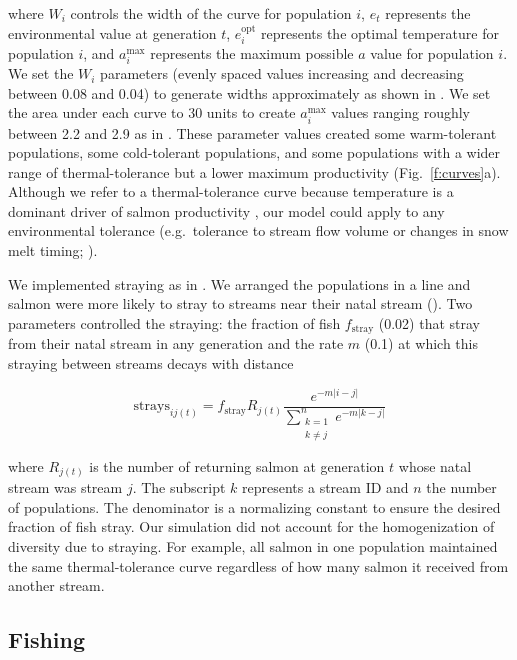 \noindent
where $W_i$ controls the width of the curve for population $i$, $e_t$ represents the environmental value at generation $t$, $e_i^{\mathrm{opt}}$ represents the optimal temperature for population $i$, and $a_i^{\mathrm{max}}$ represents the maximum possible $a$ value for population $i$. We set the $W_i$ parameters (evenly spaced values increasing and decreasing between 0.08 and 0.04) to generate widths approximately as shown in \citet{eliason2011}. We set the area under each curve to 30 units to create $a_i^{\mathrm{max}}$ values ranging roughly between 2.2 and 2.9 as in \citet{dorner2008}. These parameter values created some warm-tolerant populations, some cold-tolerant populations, and some populations with a wider range of thermal-tolerance but a lower maximum productivity (Fig.~\ref{f:curves}a). Although we refer to a thermal-tolerance curve because temperature is a dominant driver of salmon productivity \citep[e.g.][]{mccullough1999, patterson2007, eliason2011}, our model could apply to any environmental tolerance (e.g.~tolerance to stream flow volume or changes in snow melt timing; \citeauthor{crozier2008} \citeyear{crozier2008}).

We implemented straying as in \citet{cooper1999}. We arranged the populations in a line and salmon were more likely to stray to streams near their natal stream (\somstray). Two parameters controlled the straying: the fraction of fish $f_{\mathrm{stray}}$ (0.02) that stray from their natal stream in any generation and the rate $m$ (0.1) at which this straying between streams decays with distance

\[\mathrm{strays}_{ij(t)} = f_{\mathrm{stray}} R_{j(t)} \frac{e^{-m \lvert i-j
\rvert }} {\displaystyle\sum\limits_{ \substack{k = 1 \\ k \neq j}}^{n} e^{-m
\lvert k-j \rvert }}\]

\noindent
where $R_{j(t)}$ is the number of returning salmon at generation $t$ whose natal stream was stream $j$. The subscript $k$ represents a stream ID and $n$ the number of populations. The denominator is a normalizing constant to ensure the desired fraction of fish stray. Our simulation did not account for the homogenization of diversity due to straying. For example, all salmon in one population maintained the same thermal-tolerance curve regardless of how many salmon it received from another stream.

\subsection{Fishing}\label{fishing}

